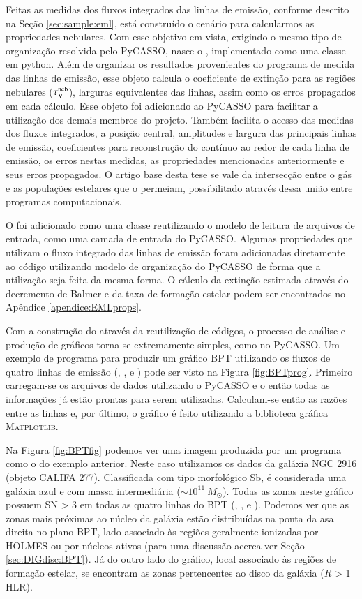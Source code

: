 Feitas as medidas dos fluxos integrados das linhas de emissão, conforme descrito na Seção \ref{sec:sample:eml}, está construído o cenário para calcularmos as propriedades nebulares. Com esse objetivo em vista, exigindo o mesmo tipo de organização resolvida pelo PyCASSO, nasce o \emldc, implementado como uma classe em {\sc python}. Além de organizar os resultados provenientes do programa de medida das linhas de emissão, esse objeto calcula o coeficiente de extinção para as regiões nebulares ($\tau_{\mathrm{V}}^{\mathrm{neb}}$), larguras equivalentes das linhas, assim como os erros propagados em cada cálculo. Esse objeto foi adicionado ao PyCASSO para facilitar a utilização dos demais membros do projeto. Também facilita o acesso das medidas dos fluxos integrados, a posição central, amplitudes e largura das principais linhas de emissão, coeficientes para reconstrução do contínuo ao redor de cada linha de emissão, os erros nestas medidas, as propriedades mencionadas anteriormente e seus erros propagados. O artigo base desta tese se vale da intersecção entre o gás e as populações estelares que o permeiam, possibilitado através dessa união entre programas computacionais.

O \emldc foi adicionado como uma classe reutilizando o modelo de leitura de arquivos de entrada, como uma camada de entrada do PyCASSO. Algumas propriedades que utilizam o fluxo integrado das linhas de emissão foram adicionadas diretamente ao código utilizando modelo de organização do PyCASSO de forma que a utilização seja feita da mesma forma. O cálculo da extinção estimada através do decremento de Balmer e da taxa de formação estelar podem ser encontrados no Apêndice \ref{apendice:EMLprops}.

Com a construção do \emldc através da reutilização de códigos, o processo de análise e produção de gráficos torna-se extremamente simples, como no PyCASSO. Um exemplo de programa para produzir um gráfico BPT utilizando os fluxos de quatro linhas de emissão (\Ha, \Hb, \oiii e \nii) pode ser visto na Figura \ref{fig:BPTprog}. Primeiro carregam-se os arquivos de dados utilizando o PyCASSO e o \emldc então todas as informações já estão prontas para serem utilizadas. Calculam-se então as razões entre as linhas e, por último, o gráfico é feito utilizando a biblioteca gráfica M\textsc{atplotlib}.

Na Figura \ref{fig:BPTfig} podemos ver uma imagem produzida por um programa como o do exemplo anterior. Neste caso utilizamos os dados da galáxia NGC 2916 (objeto CALIFA 277). Classificada com tipo morfológico Sb, é considerada uma galáxia azul e com massa intermediária ($\sim 10^{11}\ M_\odot$). Todas as zonas neste gráfico possuem SN > 3 em todas as quatro linhas do BPT (\Hb, \oiii, \Ha e \nii). Podemos ver que as zonas mais próximas ao núcleo da galáxia estão distribuídas na ponta da asa direita no plano BPT, lado associado às regiões geralmente ionizadas por HOLMES ou por núcleos ativos (para uma discussão acerca ver Seção \ref{sec:DIGdisc:BPT}). Já do outro lado do gráfico, local associado às regiões de formação estelar, se encontram as zonas pertencentes ao disco da galáxia ($R$ > 1 HLR).


